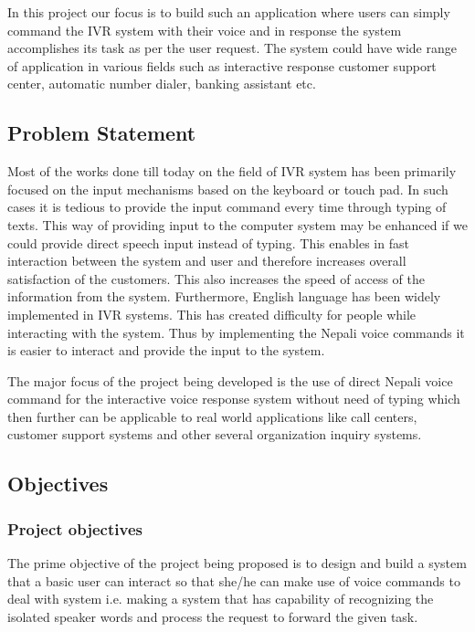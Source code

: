 In this project our focus is to build such an application where users can simply command the IVR system with their voice and in response the system accomplishes its task as per the user request. The system could have wide range of application in various fields such as interactive response customer support center, automatic number dialer, banking assistant etc.


\subsection{Problem Statement}

Most of the works done till today on the field of IVR system has been primarily focused on the input mechanisms based on the keyboard or touch pad. In such cases it is tedious to provide the input command every time through typing of texts. This way of providing input to the computer system may be enhanced if we could provide direct speech input instead of typing. This enables in fast interaction between the system and user and therefore increases overall satisfaction of the customers. This also increases the speed of access of the information from the system.
Furthermore, English language has been widely implemented in IVR systems. This has created difficulty for people while interacting with the system. Thus by implementing the Nepali voice commands it is easier to interact and provide the input to the system.


The major focus of the project being developed is the use of direct Nepali voice command for the interactive voice response system without need of typing which then further can be applicable to real world applications like call centers, customer support systems and other several organization inquiry systems.

\subsection{Objectives}
\subsubsection{Project objectives}

The prime objective of the project being proposed is to design and build a system that a basic user can interact so that she/he can make use of voice commands to deal with system i.e. making a system that has capability of recognizing the isolated speaker words and process the request to forward the given task.

